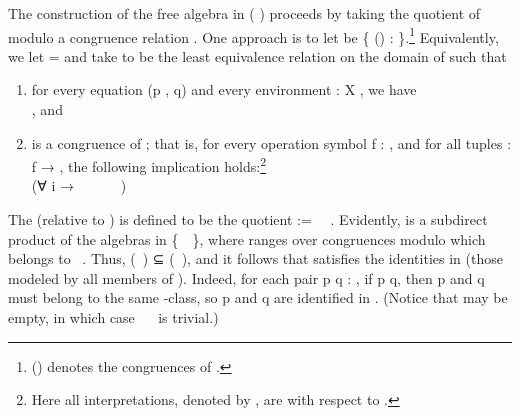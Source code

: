The construction of the free algebra in  ( )
proceeds by taking the quotient of  modulo a congruence relation .  One approach is to let
 be \{   () :  \af{/}   
\}.\footnote{ () denotes the congruences of .}
Equivalently, we let  =   and take  to be the least equivalence relation
on the domain of  such that
\begin{enumerate}
\item for every equation (\ab p , \ab q)    and every
environment  : \ab X  , we have\\
      , and
\item {} is a congruence of ; that is, for every operation symbol \ab
f : , and for all tuples   :  \ab f
→ , the following implication holds:\footnote{Here all
interpretations, denoted by , are with respect to .}\\[-8pt]

(∀ i → ~~~~~~)
 ~~~~~~\\[-8pt]
\end{enumerate}
The   (relative to
) is defined to be the quotient  := ~\af{/}~.
Evidently,  is a subdirect product of the algebras in \{~\af{/}~\!\},
where  ranges over congruences modulo which  belongs to ~.
Thus,   (~) ⊆ (~), and it follows
that  satisfies the identities in   (those modeled by all members of
).  Indeed, for each pair \ab p \ab q : , if   \ab p  \ab
q, then \ab p and \ab q must belong to the same -class, so \ab p and \ab q are
identified in . \ifshort\else (Notice that  may be empty, in which case
~\af{/}~ is trivial.) \fi

